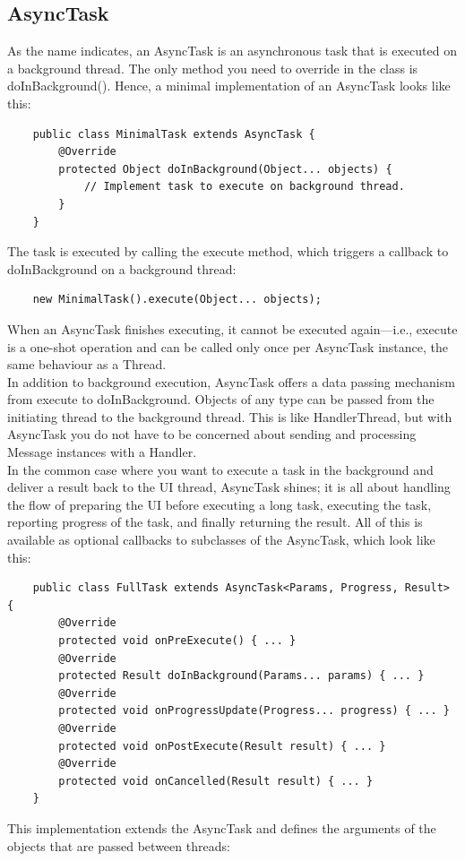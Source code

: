 \subsection{AsyncTask}
As the name indicates, an AsyncTask is an asynchronous task that is executed on a background thread. The only method you need to override in the class is doInBackground(). Hence, a minimal implementation of an AsyncTask looks like this:
\begin{lstlisting}
	public class MinimalTask extends AsyncTask {
		@Override
		protected Object doInBackground(Object... objects) {
			// Implement task to execute on background thread.
		}
	}
\end{lstlisting}
The task is executed by calling the execute method, which triggers a callback to doInBackground on a background thread:
\begin{lstlisting}
	new MinimalTask().execute(Object... objects);
\end{lstlisting}
When an AsyncTask finishes executing, it cannot be executed again—i.e., execute is a one-shot operation and can be called only once per AsyncTask instance, the same behaviour as a Thread.\\
In addition to background execution, AsyncTask offers a data passing mechanism from execute to doInBackground. Objects of any type can be passed from the initiating thread to the background thread. This is like HandlerThread, but with AsyncTask you do not have to be concerned about sending and processing Message instances with a Handler.\\
In the common case where you want to execute a task in the background and deliver a result back to the UI thread, AsyncTask shines; it is all about handling the flow of preparing the UI before executing a long task, executing the task, reporting progress of the task, and finally returning the result. All of this is available as optional callbacks to subclasses of the AsyncTask, which look like this:
\begin{lstlisting}
	public class FullTask extends AsyncTask<Params, Progress, Result> {
		@Override
		protected void onPreExecute() { ... }
		@Override
		protected Result doInBackground(Params... params) { ... }
		@Override
		protected void onProgressUpdate(Progress... progress) { ... }
		@Override
		protected void onPostExecute(Result result) { ... }
		@Override
		protected void onCancelled(Result result) { ... }
	}
\end{lstlisting}
This implementation extends the AsyncTask and defines the arguments of the objects that are passed between threads:
